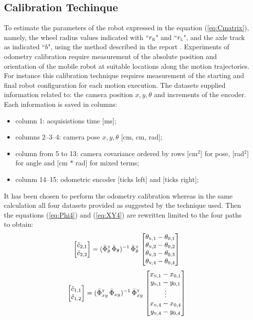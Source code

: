 \subsection{Calibration Techinque}
To estimate the parameters of the robot expressed in the equation (\ref{eq:Cmatrix}), namely, the wheel radius values indicated with ``$r_\textsc{r}$" and ``$r_\textsc{l}$", and the axle track as indicated ``$b$", using the method described in the report \cite{1512356}.
Experiments of odometry calibration require measurement of the absolute position and orientation of the mobile robot at suitable locations along the motion trajectories. For instance this calibration technique requires measurement of the starting and final robot configuration for each motion execution. The datasets supplied information related to: the camera position $x, y, \theta$ and increments of the encoder.
Each information is saved in columns:
\begin{itemize}
\item column 1: acquisistions time [ms];
\item columns 2--3--4: camera pose $x, y, \theta$ [cm, cm, rad];
\item column from 5 to 13: camera covariance ordered by rows [cm$^2$] for pose, [rad$^2$] for angle and [cm$\,*\,$rad] for mixed terms;
\item colunm 14--15: odometric encoder [ticks left] and [ticks right];
\end{itemize}
It has been chosen to perform the odometry calibration whereas in the same calculation all four datasets provided as suggested by the technique used. Then the equations (\ref{eq:Phi4}) and (\ref{eq:XY4}) are rewritten limited to the four paths to obtain:
\begin{equation}
\label{eq:Phi4}
	\begin{bmatrix}
		\hat{c}_{2,1}\\
		\hat{c}_{2,2}
	\end{bmatrix} =	(\bar{\Phi}_{\theta}^{\textsc{t}} \, \bar{\Phi}_{\theta})^{-1} \, \bar{\Phi}_{\theta}^{\textsc{t}} \, 
	\begin{bmatrix}
		\theta_{\textsc{n},1} - \theta_{0,1}\\
		\theta_{\textsc{n},2} - \theta_{0,2}\\
		\theta_{\textsc{n},3} - \theta_{0,3}\\
		\theta_{\textsc{n},4} - \theta_{0,4}
	\end{bmatrix}
\end{equation}
\begin{equation}
\label{eq:XY4}
	\begin{bmatrix}
		\hat{c}_{1,1}\\
		\hat{c}_{1,2}
	\end{bmatrix} = (\bar{\Phi}_{xy}^{\textsc{t}} \, \bar{\Phi}_{xy})^{-1} \, \bar{\Phi}_{xy}^{\textsc{t}} \, 
	\begin{bmatrix}
		x_{\textsc{n},1} - x_{0,1}\\
		y_{\textsc{n},1} - y_{0,1}\\
		\vdots \\
		x_{\textsc{n},4} - x_{0,4}\\
		y_{\textsc{n},4} - y_{0,4}
	\end{bmatrix}
\end{equation}
